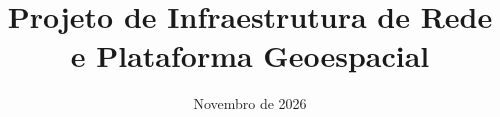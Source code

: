 \documentclass[consolidado]{modern-engsoft}
\title{Projeto de Infraestrutura de Rede e Plataforma Geoespacial}
\date{Novembro de 2026}
\begin{document}
\imprimircapa

\tableofcontents
\newpage
\listoffigures
\newpage
\listoftables
\newpage








\end{document}
